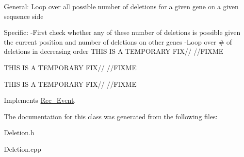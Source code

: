 General\+: Loop over all possible number of deletions for a given gene on a given sequence side

Specific\+: -\/\+First check whether any of these number of deletions is possible given the current position and number of deletions on other genes -\/\+Loop over \# of deletions in decreasing order T\+H\+IS IS A T\+E\+M\+P\+O\+R\+A\+RY F\+I\+X// //\+F\+I\+X\+ME

T\+H\+IS IS A T\+E\+M\+P\+O\+R\+A\+RY F\+I\+X// //\+F\+I\+X\+ME

T\+H\+IS IS A T\+E\+M\+P\+O\+R\+A\+RY F\+I\+X// //\+F\+I\+X\+ME

Implements \hyperlink{classRec__Event_a0fea607ec06bdd1a7f5ebb04a96e5253}{Rec\+\_\+\+Event}.



The documentation for this class was generated from the following files\+:\begin{DoxyCompactItemize}
\item 
Deletion.\+h\item 
Deletion.\+cpp\end{DoxyCompactItemize}
